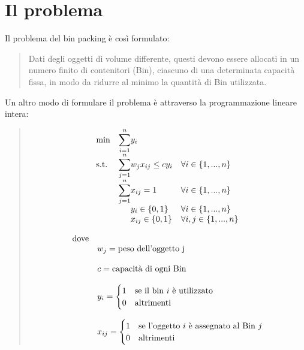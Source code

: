 \section{Il problema}
Il problema del bin packing è così formulato:

\begin{quote}
	Dati degli oggetti di volume differente, questi devono essere allocati in un numero finito di
	contenitori (Bin), ciascuno di una determinata capacità fissa, in modo da ridurre al minimo la
	quantità di Bin utilizzata.\\
\end{quote}

\noindent
Un altro modo di formulare il problema è attraverso la programmazione lineare intera:

\begin{quote}	
	\begin{equation*}
		\begin{array}{ll@{}ll}
			\text{min}  & \displaystyle\sum\limits_{i=1}^{n} & y_i 					  & \\
			\text{s.t.} & \displaystyle\sum\limits_{j=1}^{n} & w_j x_{ij} \leq c y_i  & \forall i \in \{1, ..., n\}    \\
		                & \displaystyle\sum\limits_{j=1}^{n} & x_{ij} = 1 			  & \forall i \in \{1, ..., n\}    \\
		             	& 								     & y_{i} \in \{0,1\}	  & \forall i \in \{1, ..., n\}    \\
		                & 								     & x_{ij} \in \{0,1\}  	  & \forall i, j \in \{1, ..., n\} \\
		\end{array}
	\end{equation*}
	
	\begin{equation*}
		\begin{array}{ll@{}ll}
	    	\text{dove} &									& \\
	    				& w_j = \text{peso dell'oggetto j}	& \\ \\
		    			& c = \text{capacità di ogni Bin}	& \\ \\
		    			& y_i = 
		    				\begin{cases}
    							1 & \text{se il bin } i \text{ è utilizzato} \\
    							0 & \text{altrimenti}
							\end{cases}					    & \\ \\
						& x_{ij} = 
							\begin{cases}
    							1 & \text{se l'oggetto } i \text{ è assegnato al Bin } j \\
    							0 & \text{altrimenti}
							\end{cases}					    & \\
		\end{array}
	\end{equation*}
	
\end{quote}

